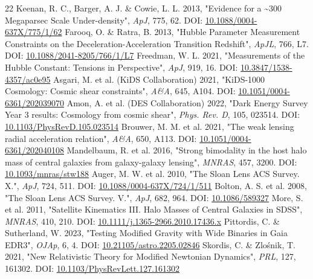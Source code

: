 \documentclass[11pt,a4paper]{article}
\begin{document}
\begin{thebibliography}{22}
 Keenan, R. C., Barger, A. J. \& Cowie, L. L. 2013, "Evidence for a \~{}300 Megaparsec Scale Under-density", \emph{ApJ}, 775, 62. DOI: \href{https://doi.org/10.1088/0004-637X/775/1/62}{10.1088/\allowbreak{}0004-637X/\allowbreak{}775/\allowbreak{}1/\allowbreak{}62}
 Farooq, O. \& Ratra, B. 2013, "Hubble Parameter Measurement Constraints on the Deceleration-Acceleration Transition Redshift", \emph{ApJL}, 766, L7. DOI: \href{https://doi.org/10.1088/2041-8205/766/1/L7}{10.1088/\allowbreak{}2041-8205/\allowbreak{}766/\allowbreak{}1/\allowbreak{}L7}
 Freedman, W. L. 2021, "Measurements of the Hubble Constant: Tensions in Perspective", \emph{ApJ}, 919, 16. DOI: \href{https://doi.org/10.3847/1538-4357/ac0e95}{10.3847/\allowbreak{}1538-4357/\allowbreak{}ac0e95}
 Asgari, M. et al. (KiDS Collaboration) 2021, "KiDS-1000 Cosmology: Cosmic shear constraints", \emph{A\&A}, 645, A104. DOI: \href{https://doi.org/10.1051/0004-6361/202039070}{10.1051/\allowbreak{}0004-6361/\allowbreak{}202039070}
 Amon, A. et al. (DES Collaboration) 2022, "Dark Energy Survey Year 3 results: Cosmology from cosmic shear", \emph{Phys. Rev. D}, 105, 023514. DOI: \href{https://doi.org/10.1103/PhysRevD.105.023514}{10.1103/\allowbreak{}PhysRevD.105.023514}
 Brouwer, M. M. et al. 2021, "The weak lensing radial acceleration relation", \emph{A\&A}, 650, A113. DOI: \href{https://doi.org/10.1051/0004-6361/202040108}{10.1051/\allowbreak{}0004-6361/\allowbreak{}202040108}
 Mandelbaum, R. et al. 2016, "Strong bimodality in the host halo mass of central galaxies from galaxy-galaxy lensing", \emph{MNRAS}, 457, 3200. DOI: \href{https://doi.org/10.1093/mnras/stw188}{10.1093/\allowbreak{}mnras/\allowbreak{}stw188}
 Auger, M. W. et al. 2010, "The Sloan Lens ACS Survey. X.", \emph{ApJ}, 724, 511. DOI: \href{https://doi.org/10.1088/0004-637X/724/1/511}{10.1088/\allowbreak{}0004-637X/\allowbreak{}724/\allowbreak{}1/\allowbreak{}511}
 Bolton, A. S. et al. 2008, "The Sloan Lens ACS Survey. V.", \emph{ApJ}, 682, 964. DOI: \href{https://doi.org/10.1086/589327}{10.1086/\allowbreak{}589327}
 More, S. et al. 2011, "Satellite Kinematics III. Halo Masses of Central Galaxies in SDSS", \emph{MNRAS}, 410, 210. DOI: \href{https://doi.org/10.1111/j.1365-2966.2010.17436.x}{10.1111/\allowbreak{}j.1365-2966.2010.17436.x}
 Pittordis, C. \& Sutherland, W. 2023, "Testing Modified Gravity with Wide Binaries in Gaia EDR3", \emph{OJAp}, 6, 4. DOI: \href{https://doi.org/10.21105/astro.2205.02846}{10.21105/\allowbreak{}astro.2205.02846}
 Skordis, C. \& Zlo\'snik, T. 2021, "New Relativistic Theory for Modified Newtonian Dynamics", \emph{PRL}, 127, 161302. DOI: \href{https://doi.org/10.1103/PhysRevLett.127.161302}{10.1103/\allowbreak{}PhysRevLett.127.161302}
\end{thebibliography}
\end{document}
